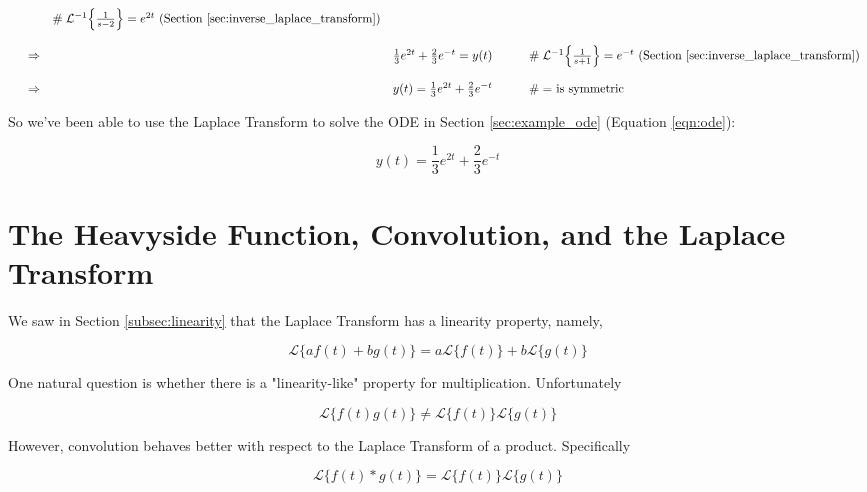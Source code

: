 \documentclass{article}
\theoremstyle{definition}
\begin{document}
\begin{equation*}
\begin{array}{lllll}
                                                                                                                   &\qquad \mathrel{\#} \text{$\mathcal{L}^{-1} \Big \{ \frac{1}{s-2} \Big \} = e^{2t}$ (Section \ref{sec:inverse_laplace_transform})}  \\
[15pt]
&\Rightarrow& \frac{1}{3} e^{2t} + \frac{2}{3} e^{-t} = y(t)                          &\qquad \mathrel{\#} \text{$\mathcal{L}^{-1} \Big \{ \frac{1}{s+1} \Big \} = e^{-t}$ (Section \ref{sec:inverse_laplace_transform})}  \\
[15pt]
&\Rightarrow& y(t) = \frac{1}{3} e^{2t} + \frac{2}{3} e^{-t}                          &\qquad \mathrel{\#} \text{$=$ is symmetric}
\end{array}
\end{equation*}


\bigskip
\noindent
So we've been able to use the Laplace Transform to solve the ODE in Section \ref{sec:example_ode} (Equation \ref{eqn:ode}):

\bigskip
\begin{equation*}
y(t) = \frac{1}{3} e^{2t} + \frac{2}{3} e^{-t}   
\end{equation*}

\section{\large The Heavyside Function, Convolution, and the Laplace Transform}
We saw in Section \ref{subsec:linearity} that the Laplace Transform has a linearity property, namely, 

\bigskip
\begin{equation*}
\mathcal{L}\{af (t) + bg(t)\} = a\mathcal{L}\{f(t)\} + b\mathcal{L}\{g(t)\}
\end{equation*}

\bigskip
\noindent
One natural question is whether there is a "linearity-like" property for multiplication. Unfortunately

\bigskip
\begin{equation*}
\mathcal{L}\{f(t)g(t)\} \neq  \mathcal{L}\{f(t)\}\mathcal{L}\{g(t)\}
\end{equation*}

\bigskip
\noindent
However, convolution behaves better with respect to the Laplace Transform of a product. Specifically

\bigskip
\begin{equation}
\mathcal{L}\{f(t) \ast g(t)\} =  \mathcal{L}\{f(t)\}\mathcal{L}\{g(t)\}
\label{eqn:lt_of_convolution}
\end{equation}
\end{document}
